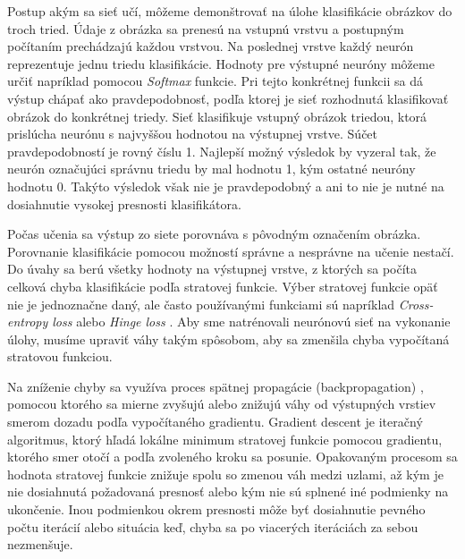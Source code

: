 Postup akým sa sieť učí, môžeme demonštrovať na úlohe klasifikácie obrázkov do troch tried. Údaje z obrázka sa prenesú na vstupnú vrstvu a postupným počítaním prechádzajú každou vrstvou. Na poslednej vrstve každý neurón reprezentuje jednu triedu klasifikácie. Hodnoty pre výstupné neuróny môžeme určiť napríklad pomocou \textit{Softmax} funkcie. Pri tejto konkrétnej funkcii sa dá výstup chápať ako pravdepodobnosť, podľa ktorej je sieť rozhodnutá klasifikovať obrázok do konkrétnej triedy. Sieť klasifikuje vstupný obrázok triedou, ktorá prislúcha neurónu s najvyššou hodnotou na výstupnej vrstve. Súčet pravdepodobností je rovný číslu 1. Najlepší možný výsledok by vyzeral tak, že neurón označujúci správnu triedu by mal hodnotu 1, kým ostatné neuróny hodnotu 0. Takýto výsledok však nie je pravdepodobný a ani to nie je nutné na dosiahnutie vysokej presnosti klasifikátora.

Počas učenia sa výstup zo siete porovnáva s pôvodným označením obrázka. Porovnanie klasifikácie pomocou možností správne a nesprávne na učenie nestačí. Do úvahy sa berú všetky hodnoty na výstupnej vrstve, z ktorých sa počíta celková chyba klasifikácie podľa stratovej funkcie. Výber stratovej funkcie opäť nie je jednoznačne daný, ale často používanými funkciami sú napríklad \textit{Cross-entropy loss} alebo \textit{Hinge loss} \cite{loss}. Aby sme natrénovali neurónovú sieť na vykonanie úlohy, musíme upraviť váhy takým spôsobom, aby sa zmenšila chyba vypočítaná stratovou funkciou.

Na zníženie chyby sa využíva proces spätnej propagácie (backpropagation) \cite{bp}, pomocou ktorého sa mierne zvyšujú alebo znižujú váhy od výstupných vrstiev smerom dozadu podľa vypočítaného gradientu. Gradient descent je iteračný algoritmus, ktorý hľadá lokálne minimum stratovej funkcie pomocou gradientu, ktorého smer otočí a podľa zvoleného kroku sa posunie. Opakovaným procesom sa hodnota stratovej funkcie znižuje spolu so zmenou váh medzi uzlami, až kým je nie dosiahnutá požadovaná presnosť alebo kým nie sú splnené iné podmienky na ukončenie. Inou podmienkou okrem presnosti môže byť dosiahnutie pevného počtu iterácií alebo situácia keď, chyba sa po viacerých iteráciách za sebou nezmenšuje.

